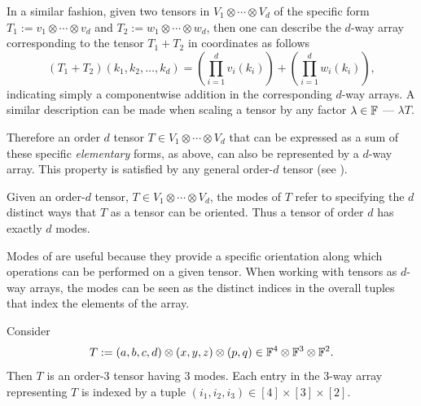 \documentclass[../Lael_John_MasterThesis_Draft.tex]{subfiles}
\begin{document}

In a similar fashion, given two tensors in $V_1 \otimes \cdots \otimes V_d$ of the specific form $T_1:= v_1 \otimes \cdots \otimes v_d$ and $T_2:= w_1 \otimes \cdots \otimes w_d$, then one can describe the $d$-way array corresponding to the tensor $T_1 + T_2$ in coordinates as follows $$(T_1 + T_2)(k_1, k_2, \ldots, k_d) = \left(\prod_{i=1}^{d} v_i(k_i)\right) + \left(\prod_{i=1}^{d} w_i(k_i)\right),$$indicating simply a componentwise addition in the corresponding $d$-way arrays. A similar description can be made when scaling a tensor by any factor $\lambda \in\mathbb{F}$ --- $\lambda T$.

Therefore an order $d$ tensor $T \in V_1 \otimes \cdots \otimes V_d$ that can be expressed as a sum of these specific \textit{elementary} forms, as above, can also be represented by a $d$-way array. This property is satisfied by any general order-$d$ tensor (see ).
\begin{definition}[Modes of a Tensor]
    Given an order-$d$ tensor, $T \in V_1 \otimes \cdots \otimes V_d$, the modes of $T$ refer to specifying the $d$ distinct ways that $T$ as a tensor can be oriented. Thus a tensor of order $d$ has exactly $d$ modes.
\end{definition}
\begin{remark}
    Modes of are useful because they provide a specific orientation along which operations can be performed on a given tensor. When working with tensors as $d$-way arrays, the  modes can be seen as the distinct indices in the overall tuples that index the elements of the array.
\end{remark}
\begin{example}
    Consider $$T:= (a,b,c,d)\otimes(x,y,z)\otimes(p,q) \in \mathbb{F}^4 \otimes \mathbb{F}^3 \otimes \mathbb{F}^2.$$Then $T$ is an order-$3$ tensor having $3$ modes. Each entry in the $3$-way array representing $T$ is indexed by a tuple $(i_1,i_2,i_3) \in [4] \times [3] \times [2].$
\end{example}
\end{document}
